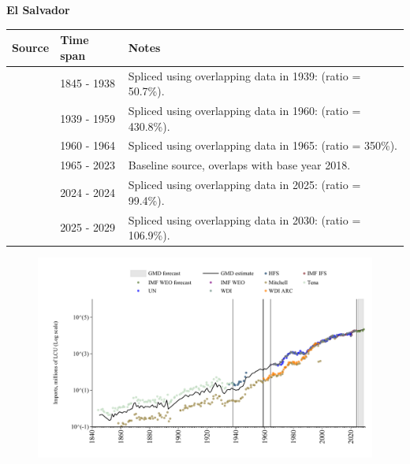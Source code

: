 \documentclass[12pt,a4paper,landscape]{article}
\begin{document}
\begin{adjustbox}{max totalsize={\paperwidth}{\paperheight},center}
\begin{minipage}[t][\textheight][t]{\textwidth}
\vspace*{0.5cm}
{}
\begin{center}
{\Large\bfseries El Salvador}
\end{center}
\vspace{0.5cm}
\begin{table}[H]
\centering
\small
\begin{tabular}{|l|l|l|}
\hline
\textbf{Source} & \textbf{Time span} & \textbf{Notes} \\
\hline
\rowcolor{white}\cite{Tena}& 1845 - 1938 &Spliced using overlapping data in 1939: (ratio = 50.7\%).\\
\rowcolor{lightgray}\cite{Mitchell}& 1939 - 1959 &Spliced using overlapping data in 1960: (ratio = 430.8\%).\\
\rowcolor{white}\cite{WDI_ARC}& 1960 - 1964 &Spliced using overlapping data in 1965: (ratio = 350\%).\\
\rowcolor{lightgray}\cite{WDI}& 1965 - 2023 &Baseline source, overlaps with base year 2018.\\
\rowcolor{white}\cite{IMF_IFS}& 2024 - 2024 &Spliced using overlapping data in 2025: (ratio = 99.4\%).\\
\rowcolor{lightgray}\cite{IMF_WEO_forecast}& 2025 - 2029 &Spliced using overlapping data in 2030: (ratio = 106.9\%).\\
\hline
\end{tabular}
\end{table}
\begin{figure}[H]
\centering
\includegraphics[width=\textwidth,height=0.6\textheight,keepaspectratio]{graphs/SLV_imports.pdf}
\end{figure}
\end{minipage}
\end{adjustbox}
\end{document}

